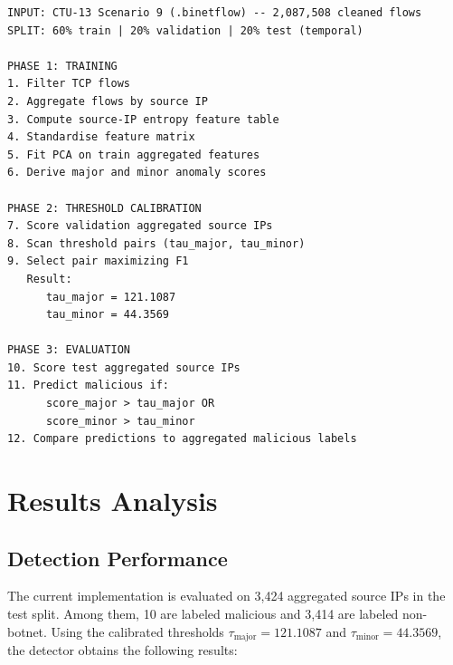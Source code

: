 \documentclass{article}
\begin{document}
\begin{lstlisting}[caption={Complete pipeline: from raw flows to evaluation}]
INPUT: CTU-13 Scenario 9 (.binetflow) -- 2,087,508 cleaned flows
SPLIT: 60% train | 20% validation | 20% test (temporal)

PHASE 1: TRAINING
1. Filter TCP flows
2. Aggregate flows by source IP
3. Compute source-IP entropy feature table
4. Standardise feature matrix
5. Fit PCA on train aggregated features
6. Derive major and minor anomaly scores

PHASE 2: THRESHOLD CALIBRATION
7. Score validation aggregated source IPs
8. Scan threshold pairs (tau_major, tau_minor)
9. Select pair maximizing F1
   Result:
      tau_major = 121.1087
      tau_minor = 44.3569

PHASE 3: EVALUATION
10. Score test aggregated source IPs
11. Predict malicious if:
      score_major > tau_major OR
      score_minor > tau_minor
12. Compare predictions to aggregated malicious labels
\end{lstlisting}

\section{Results Analysis}
\label{sec:results}

\subsection{Detection Performance}

The current implementation is evaluated on 3{,}424 aggregated source IPs in the test split. Among them, 10 are labeled malicious and 3{,}414 are labeled non-botnet. Using the calibrated thresholds $\tau_{\text{major}} = 121.1087$ and $\tau_{\text{minor}} = 44.3569$, the detector obtains the following results:
\end{document}
